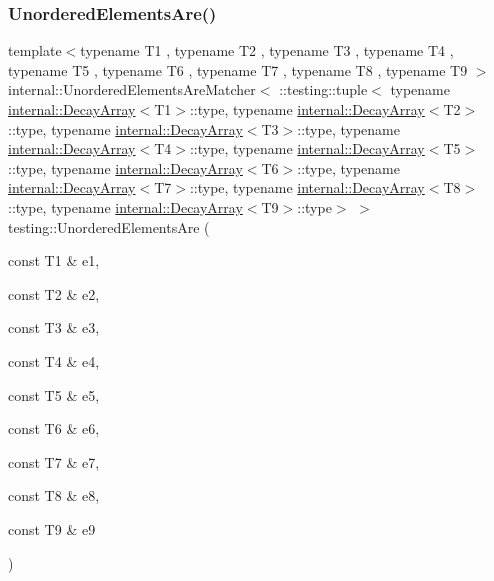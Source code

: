 \subsubsection{\texorpdfstring{UnorderedElementsAre()}{UnorderedElementsAre()}\hspace{0.1cm}{\footnotesize\ttfamily [10/11]}}
{\footnotesize\ttfamily template$<$typename T1 , typename T2 , typename T3 , typename T4 , typename T5 , typename T6 , typename T7 , typename T8 , typename T9 $>$ \\
internal\+::\+Unordered\+Elements\+Are\+Matcher$<$ \+::testing\+::tuple$<$ typename \mbox{\hyperlink{structtesting_1_1internal_1_1_decay_array}{internal\+::\+Decay\+Array}}$<$T1$>$\+::type, typename \mbox{\hyperlink{structtesting_1_1internal_1_1_decay_array}{internal\+::\+Decay\+Array}}$<$T2$>$\+::type, typename \mbox{\hyperlink{structtesting_1_1internal_1_1_decay_array}{internal\+::\+Decay\+Array}}$<$T3$>$\+::type, typename \mbox{\hyperlink{structtesting_1_1internal_1_1_decay_array}{internal\+::\+Decay\+Array}}$<$T4$>$\+::type, typename \mbox{\hyperlink{structtesting_1_1internal_1_1_decay_array}{internal\+::\+Decay\+Array}}$<$T5$>$\+::type, typename \mbox{\hyperlink{structtesting_1_1internal_1_1_decay_array}{internal\+::\+Decay\+Array}}$<$T6$>$\+::type, typename \mbox{\hyperlink{structtesting_1_1internal_1_1_decay_array}{internal\+::\+Decay\+Array}}$<$T7$>$\+::type, typename \mbox{\hyperlink{structtesting_1_1internal_1_1_decay_array}{internal\+::\+Decay\+Array}}$<$T8$>$\+::type, typename \mbox{\hyperlink{structtesting_1_1internal_1_1_decay_array}{internal\+::\+Decay\+Array}}$<$T9$>$\+::type$>$ $>$ testing\+::\+Unordered\+Elements\+Are (\begin{DoxyParamCaption}\item[{const T1 \&}]{e1,  }\item[{const T2 \&}]{e2,  }\item[{const T3 \&}]{e3,  }\item[{const T4 \&}]{e4,  }\item[{const T5 \&}]{e5,  }\item[{const T6 \&}]{e6,  }\item[{const T7 \&}]{e7,  }\item[{const T8 \&}]{e8,  }\item[{const T9 \&}]{e9 }\end{DoxyParamCaption})\hspace{0.3cm}{\ttfamily [inline]}}

\mbox{\label{namespacetesting_ae0e6c9754b17623a64358da8d38c4d13}} 
